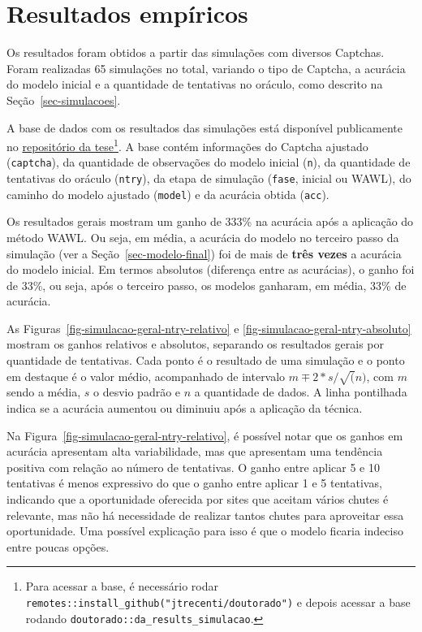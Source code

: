 \documentclass[12pt,twoside,brazilian]{book}
\begin{document}
\hypertarget{sec-result-sim}{%
\section{Resultados empíricos}\label{sec-result-sim}}

Os resultados foram obtidos a partir das simulações com diversos
Captchas. Foram realizadas 65 simulações no total, variando o tipo de
Captcha, a acurácia do modelo inicial e a quantidade de tentativas no
oráculo, como descrito na Seção~\ref{sec-simulacoes}.

A base de dados com os resultados das simulações está disponível
publicamente no
\href{https://github.com/jtrecenti/doutorado}{repositório da
tese}\footnote{Para acessar a base, é necessário rodar
  \texttt{remotes::install\_github("jtrecenti/doutorado")} e depois
  acessar a base rodando \texttt{doutorado::da\_results\_simulacao}.}. A
base contém informações do Captcha ajustado (\texttt{captcha}), da
quantidade de observações do modelo inicial (\texttt{n}), da quantidade
de tentativas do oráculo (\texttt{ntry}), da etapa de simulação
(\texttt{fase}, inicial ou WAWL), do caminho do modelo ajustado
(\texttt{model}) e da acurácia obtida (\texttt{acc}).

Os resultados gerais mostram um ganho de 333\% na acurácia após a
aplicação do método WAWL. Ou seja, em média, a acurácia do modelo no
terceiro passo da simulação (ver a Seção~\ref{sec-modelo-final}) foi de
mais de \textbf{três vezes} a acurácia do modelo inicial. Em termos
absolutos (diferença entre as acurácias), o ganho foi de 33\%, ou seja,
após o terceiro passo, os modelos ganharam, em média, 33\% de acurácia.

As Figuras~\ref{fig-simulacao-geral-ntry-relativo} e
\ref{fig-simulacao-geral-ntry-absoluto} mostram os ganhos relativos e
absolutos, separando os resultados gerais por quantidade de tentativas.
Cada ponto é o resultado de uma simulação e o ponto em destaque é o
valor médio, acompanhado de intervalo \(m \mp 2*s/\sqrt(n)\), com \(m\)
sendo a média, \(s\) o desvio padrão e \(n\) a quantidade de dados. A
linha pontilhada indica se a acurácia aumentou ou diminuiu após a
aplicação da técnica.

Na Figura~\ref{fig-simulacao-geral-ntry-relativo}, é possível notar que
os ganhos em acurácia apresentam alta variabilidade, mas que apresentam
uma tendência positiva com relação ao número de tentativas. O ganho
entre aplicar 5 e 10 tentativas é menos expressivo do que o ganho entre
aplicar 1 e 5 tentativas, indicando que a oportunidade oferecida por
sites que aceitam vários chutes é relevante, mas não há necessidade de
realizar tantos chutes para aproveitar essa oportunidade. Uma possível
explicação para isso é que o modelo ficaria indeciso entre poucas
opções.
\end{document}
